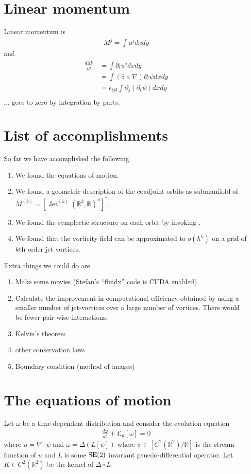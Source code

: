 \documentclass[12pt]{amsart}
\newcommand{\R}{\ensuremath{\mathbb{R}}}
\DeclareMathOperator{\Jet}{Jet}
\begin{document}
\section{Linear momentum}
\label{sec:linear}
Linear momentum is
\begin{align*}
  M^j = \int u^j dx dy
\end{align*}
and
\begin{align*}
  \frac{dM^j}{dt} &= \int \partial_t u^j dxdy \\
  &= \int (\hat{z} \times \nabla) \partial_t \psi dxdy \\
  &= \epsilon_{ij3} \int \partial_j( \partial_t \psi) dx dy \\
\end{align*}
... goes to zero by integration by parts.



\section{List of accomplishments}
So far we have accomplished the following
\begin{enumerate}
\item We found the equations of motion.
\item We found a geometric description of the coadjoint orbits as submanifold of $M^{(k)} = [\Jet^{(k)}(\R^2,\R)^n]^*$.
\item We found the symplectic structure on each orbit by invoking \cite{MarsdenWeinstein1983}.
\item We found that the vorticity field can be approximated to $o(h^k)$ on a grid of $k$th order jet vortices.
\end{enumerate}

Extra things we could do are
\begin{enumerate}
\item Make some movies (Stefan's ``fluidx'' code is CUDA enabled)
\item Calculate the improvement in computational efficiency obtained by using a smaller number of jet-vortices over a large number of vortices.
  There would be fewer pair-wise interactions.
\item Kelvin's theorem
\item other conservation laws
\item Boundary condition (method of images)
\end{enumerate}


\section{The equations of motion}
\label{sec:eom}
Let $\omega$ be a time-dependent distribution and consider the evolution equation
\begin{align}
  \frac{d\omega}{dt} + \pounds_u [\omega] = 0 \label{eq:eom}
\end{align}
where $u = \nabla^\perp \psi$ and $\omega = \Delta ( L[ \psi] )$ where $\psi \in [C^2(\R^2) / \R]$ is the stream function of $u$ and $L$ is some
${\rm SE}(2)$ invariant psuedo-differential operator.
Let $K \in C^2(\R^2)$ be the kernel of $\Delta \circ L$.
\end{document}
